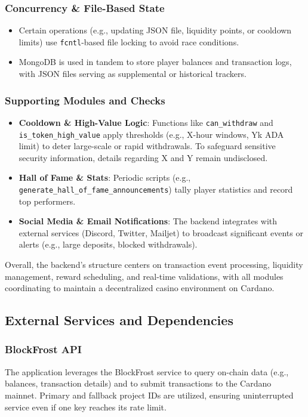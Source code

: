 \documentclass[11pt,a4paper]{article}
\begin{document}
\subsubsection{Concurrency \& File-Based State}
\begin{itemize}
    \item Certain operations (e.g., updating JSON file, liquidity points, or cooldown limits) use \texttt{fcntl}-based file locking to avoid race conditions.
    \item MongoDB is used in tandem to store player balances and transaction logs, with JSON files serving as supplemental or historical trackers.
\end{itemize}

\subsubsection{Supporting Modules and Checks}
\begin{itemize}
    \item \textbf{Cooldown \& High-Value Logic}: Functions like \texttt{can\_withdraw} and \texttt{is\_token\_high\_value} apply thresholds (e.g., X-hour windows, Yk ADA limit) to deter large-scale or rapid withdrawals. To safeguard sensitive security information, details regarding X and Y remain undisclosed.
    \item \textbf{Hall of Fame \& Stats}: Periodic scripts (e.g., \texttt{generate\_hall\_of\_fame\_announcements}) tally player statistics and record top performers.
    \item \textbf{Social Media \& Email Notifications}: The backend integrates with external services (Discord, Twitter, Mailjet) to broadcast significant events or alerts (e.g., large deposits, blocked withdrawals).
\end{itemize}

Overall, the backend's structure centers on transaction event processing, liquidity management, reward scheduling, and real-time validations, with all modules coordinating to maintain a decentralized casino environment on Cardano.

\subsection{External Services and Dependencies}

\subsubsection{BlockFrost API}
The application leverages the BlockFrost service to query on-chain data (e.g., balances, transaction details) and to submit transactions to the Cardano mainnet. Primary and fallback project IDs are utilized, ensuring uninterrupted service even if one key reaches its rate limit.
\end{document}

